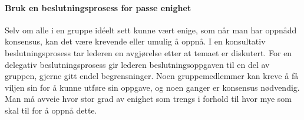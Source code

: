 \paragraph{Bruk en beslutningsprosess for passe enighet}\label{beslutningsprosess}
Selv om alle i en gruppe idéelt sett kunne vært enige, som når man har oppnådd konsensus, kan det være krevende eller umulig å oppnå.
I en konsultativ beslutningsprosess tar lederen en avgjørelse etter at temaet er diskutert.
For en delegativ beslutningsprosess gir lederen beslutningsoppgaven til en del av gruppen, gjerne gitt endel begrensninger.
Noen gruppemedlemmer kan kreve å få viljen sin for å kunne utføre sin oppgave, og noen ganger er konsensus nødvendig.
Man må avveie hvor stor grad av enighet som trengs i forhold til hvor mye som skal til for å oppnå dette.